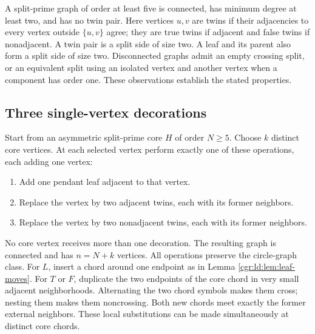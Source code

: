 \documentclass[11pt,letterpaper]{article}
\numberwithin{equation}{section}
\theoremstyle{definition}\newtheorem{definition}[theorem]{Definition}
\theoremstyle{remark}\newtheorem{remark}[theorem]{Remark}
\begin{document}
A split-prime graph of order at least five is connected, has
minimum degree at least two, and has no twin pair. Here vertices
$u,v$ are twins if their adjacencies to every vertex outside
$\{u,v\}$ agree; they are true twins if adjacent and false twins
if nonadjacent. A twin pair is a split side of size two. A leaf
and its parent also form a split side of size two. Disconnected
graphs admit an empty crossing split, or an equivalent split
using an isolated vertex and another vertex when a component has
order one. These observations establish the stated properties.

\subsection{Three single-vertex decorations}
Start from an asymmetric split-prime core $H$ of order $N\ge5$.
Choose $k$ distinct core vertices. At each selected vertex perform
exactly one of these operations, each adding one vertex:
\begin{enumerate}
\item[$L$.] Add one pendant leaf adjacent to that vertex.
\item[$T$.] Replace the vertex by two adjacent twins, each with
its former neighbors.
\item[$F$.] Replace the vertex by two nonadjacent twins, each
with its former neighbors.
\end{enumerate}
No core vertex receives more than one decoration. The resulting
graph is connected and has $n=N+k$ vertices. All operations
preserve the circle-graph class. For $L$, insert a chord around one
endpoint as in Lemma \ref{cgr:ld:lem:leaf-moves}. For $T$ or $F$,
duplicate the two endpoints of the core chord in very small
adjacent neighborhoods. Alternating the two chord symbols makes
them cross; nesting them makes them noncrossing. Both new chords
meet exactly the former external neighbors. These local
substitutions can be made simultaneously at distinct core chords.
\end{document}
